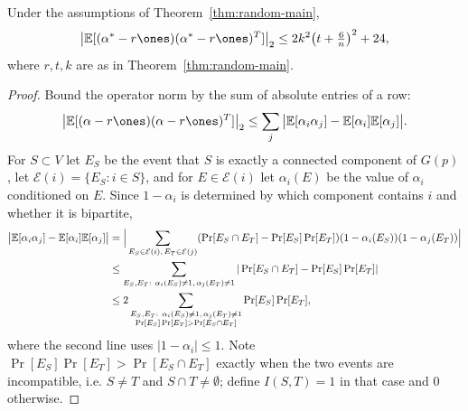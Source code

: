 \begin{lemma}
  \label{lem:moment-bound}
  Under the assumptions of Theorem~\ref{thm:random-main},
  \[
    \big|\E[(\alpha^* - r\ones)(\alpha^* - r\ones)^T]\big|_2
      \le 2k^2\big(t + \tfrac{6}{n}\big)^2 + 24,
  \]
  where $r, t, k$ are as in Theorem~\ref{thm:random-main}.
\end{lemma}
\begin{proof}
  Bound the operator norm by the sum of absolute entries of a row:
  \[
    \big|\E[(\alpha - r\ones)(\alpha - r\ones)^T]\big|_2
      \le \sum_j \big|\E[\alpha_i \alpha_j] - \E[\alpha_i]\E[\alpha_j]\big| .
  \]
  For $S \subset V$ let $E_S$ be the event that $S$ is exactly a connected
  component of $G(p)$, let $\mathcal{E}(i) = \{E_S : i \in S\}$, and for
  $E \in \mathcal{E}(i)$ let $\alpha_i(E)$ be the value of $\alpha_i$ conditioned
  on $E$. Since $1 - \alpha_i$ is determined by which component contains $i$ and
  whether it is bipartite,
  \begin{align*}
    \big|\mathbb{E}[\alpha_i \alpha_j] - \mathbb{E}[\alpha_i]\mathbb{E}[\alpha_j]\big|
      &= \Big| \sum_{E_S \in \mathcal{E}(i),\, E_T \in \mathcal{E}(j)}
        (\Pr[E_S \cap E_T] - \Pr[E_S]\Pr[E_T])(1 - \alpha_i(E_S))(1 - \alpha_j(E_T)) \Big| \\
      &\le \sum_{E_S, E_T :\ \alpha_i(E_S) \neq 1,\, \alpha_j(E_T) \neq 1}
        |\Pr[E_S \cap E_T] - \Pr[E_S]\Pr[E_T]| \\
      &\le 2 \sum_{\substack{E_S, E_T :\ \alpha_i(E_S) \neq 1,\, \alpha_j(E_T) \neq 1 \\
        \Pr[E_S]\Pr[E_T] > \Pr[E_S \cap E_T]}} \Pr[E_S]\Pr[E_T] ,
  \end{align*}
  where the second line uses $|1-\alpha_i| \le 1$. Note
  $\Pr[E_S]\Pr[E_T] > \Pr[E_S \cap E_T]$ exactly when the two events are
  incompatible, i.e. $S \neq T$ and $S \cap T \neq \emptyset$; define
  $I(S,T) = 1$ in that case and $0$ otherwise.


\end{proof}
